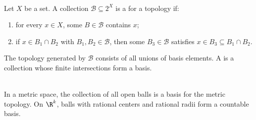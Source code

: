 \begin{definition} \label{def:basis-for-topology} \\
Let $X$ be a set. A collection $\mathcal{B}\subseteq 2^X$ is a  for a topology if:
\begin{enumerate}[label=(\roman*)]
\setlength{\itemsep}{0pt}
\item for every $x\in X$, some $B\in\mathcal{B}$ contains $x$;
\item if $x\in B_1\cap B_2$ with $B_1,B_2\in\mathcal{B}$, then some $B_3\in\mathcal{B}$ satisfies $x\in B_3\subseteq B_1\cap B_2$.
\end{enumerate}
The topology generated by $\mathcal{B}$ consists of all unions of basis elements. A  is a collection whose finite intersections form a basis.
\end{definition}

\begin{example} \label{ex:metric-balls-basis} \\
In a metric space, the collection of all open balls is a basis for the metric topology. On $\R^k$, balls with rational centers and rational radii form a countable basis.
\end{example}
